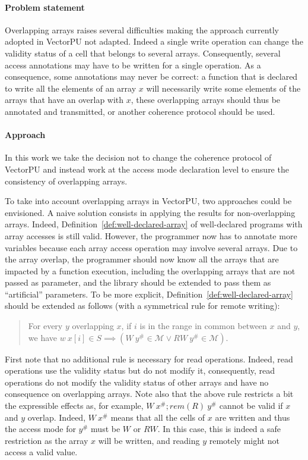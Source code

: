 \documentclass[preprint,12pt]{elsarticle}
\newcommand{\symb}[1]{\textit{#1}}
\newcommand{\rem}[1]{\symb{rem}(#1)}
\newcommand{\abs}[1]{#1^\#}
\newcommand{\AM}{\mathcal{M}}
\begin{document}
\paragraph{Problem statement}
Overlapping arrays raises several difficulties making the approach currently adopted in VectorPU not adapted. Indeed a single write operation can change the validity status of a cell that belongs to several arrays. Consequently, several access annotations may have to be written for a single operation. As a consequence, some annotations may never be correct: a function that is declared to write all the elements of an array $x$ will necessarily write some elements of the arrays that have an overlap with $x$, these overlapping arrays should thus be annotated and transmitted, or another coherence protocol should be used.

\paragraph{Approach}
In this work we take the decision not to change the coherence protocol of VectorPU and instead work at the access mode declaration level to ensure the consistency of overlapping arrays.

To take into account overlapping arrays in VectorPU, two approaches could be envisioned. A naive solution consists in applying the results for non-overlapping arrays. Indeed, Definition~\ref{def:well-declared-array} of well-declared programs with array accesses is still valid. However,  the programmer now has to annotate more variables because each array access operation may involve several arrays. Due to the array overlap, the programmer should now know all the arrays that are impacted by a function execution, including the overlapping arrays that are not passed as parameter, and the library should be extended to pass them as ``artificial'' parameters. To be more explicit, Definition~\ref{def:well-declared-array} should be extended as follows (with a symmetrical rule for remote writing):

\begin{quote}
For every $y$ overlapping $x$, if $i$ is in the range in common between $x$ and $y$, we have $w\ x[i]\in S \implies (W\ \abs y \in \AM \lor RW\ \abs y \in \AM)$.
\end{quote}

First note that no additional rule is necessary for read operations. Indeed, read operations use the validity status but do not modify it, consequently, read operations do not modify the validity status of other arrays and have no consequence on overlapping arrays.
Note also that the above rule restricts a bit the expressible effects as, for example, $W\ \abs x ; \rem{R}\ \abs y$ cannot be valid if $x$ and $y$ overlap. Indeed, $W\ \abs x$ means that all the cells of $x$ are written and thus the access mode for $\abs y$ must be $W$ or $RW$. In this case, this is indeed a safe restriction as the array $x$ will be written, and reading $y$ remotely might not access a valid value.
\end{document}
